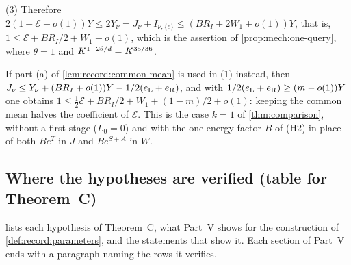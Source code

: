 \begin{remark}
(3) Therefore $2(1-\mathcal E-o(1))Y\le2Y_\nu=J_\nu+I_{\nu,\{e\}}\le
(BR_I+2W_1+o(1))Y$, that is, $1\le\mathcal E+BR_I/2+W_1+o(1)$, which is the
assertion of \cref{prop:mech:one-query}, where $\theta=1$ and
$\Kint^{1-2\theta/d}=\Kint^{35/36}$.

If part (a) of \cref{lem:record:common-mean} is used in (1) instead, then
$J_\nu\le Y_\nu+(BR_I+o(1))Y-\frac12(e_{\rm L}+e_{\rm R})$, and with
$\frac12(e_{\rm L}+e_{\rm R})\ge(m-o(1))Y$ one obtains $1\le\frac12\mathcal
E+BR_I/2+W_1+(1-m)/2+o(1)$: keeping the common mean halves the coefficient of
$\mathcal E$. This is the case $k=1$ of \cref{thm:comparison}, without a first
stage ($L_0=0$) and with the one energy factor $B$ of (H2) in place of both
$Be^T$ in $J$ and $Be^{S+A}$ in $W$.
\end{remark}

\subsection{Where the hypotheses are verified (table for Theorem~C)}\label{subsec:cp:table}

 lists each hypothesis of Theorem~C, what Part~V shows
for the construction of \cref{def:record:parameters}, and the statements that
show it. Each section of Part~V ends with a paragraph naming the rows it
verifies.


